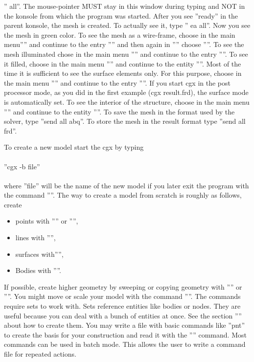 \documentclass{article}
\begin{document}
'' all''. The mouse-pointer MUST stay in this window during typing and NOT in the konsole from which the program was started. After you see ''ready'' in the parent konsole, the mesh is created. To actually see it, type '' ea all''. Now you see the mesh in green color. To see the mesh as a wire-frame, choose in the main menu'''' and continue to the entry '''' and then again in '''' choose ''''. To see the mesh illuminated chose in the main menu '''' and continue to the entry ''''. To see it filled, choose in the main menu '''' and continue to the entity ''''. Most of the time it is sufficient to see the surface elements only. For this purpose, choose in the main menu '''' and continue to the entry ''''. If you start cgx in the post processor mode, as you did in the first example (cgx result.frd), the surface mode is automatically set. To see the interior of the structure, choose in the main menu '''' and continue to the entity ''''. To save the mesh in the format used by the solver, type ''send all abq''. To store the mesh in the result format type ''send all frd''. 

To create a new model start the cgx by typing\\\\  ''cgx -b file''\\\\where ''file'' will be the name of the new model if you later exit the program with the command ''''. The way to create a model from scratch is roughly as follows, create
\begin{itemize}
\item points with '''' or '''',
\item lines with '''',
\item surfaces with'''',
\item Bodies with ''''.
\end{itemize}
If possible, create higher geometry by sweeping or copying geometry with '''' or ''''. You might move or scale your model with the command ''''. The commands require sets to work with. Sets reference entities like bodies or nodes. They are useful because you can deal with a bunch of entities at once. See the section '''' about how to create them.
You may write a file with basic commands like ''pnt'' to create the basis for your construction and read it with the '''' command. Most commands can be used in batch mode. This allows the user to write a command file for repeated actions.
\end{document}
